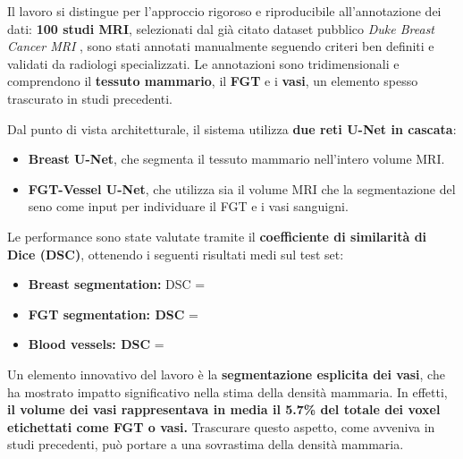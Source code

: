 Il lavoro si distingue per l’approccio rigoroso e riproducibile all’annotazione dei dati: \textbf{100 studi MRI}, selezionati dal già citato dataset pubblico \textit{Duke Breast Cancer MRI} \cite{duke_breast_mri}, sono stati annotati manualmente seguendo criteri ben definiti e validati da radiologi specializzati. Le annotazioni sono tridimensionali e comprendono il \textbf{tessuto mammario}, il \textbf{FGT} e i \textbf{vasi}, un elemento spesso trascurato in studi precedenti.

Dal punto di vista architetturale, il sistema utilizza \textbf{due reti U-Net in cascata}:
\begin{itemize}
\item \textbf{Breast U-Net}, che segmenta il tessuto mammario nell’intero volume MRI.
\item \textbf{FGT-Vessel U-Net}, che utilizza sia il volume MRI che la segmentazione del seno come input per individuare il FGT e i vasi sanguigni.
\end{itemize}

Le performance sono state valutate tramite il \textbf{coefficiente di similarità di Dice (DSC)}, ottenendo i seguenti risultati medi sul test set:
\begin{itemize}
\item \textbf{Breast segmentation:} DSC = 
\item \textbf{FGT segmentation: DSC} = 
\item \textbf{Blood vessels: DSC} = 
\end{itemize}

Un elemento innovativo del lavoro è la \textbf{segmentazione esplicita dei vasi}, che ha mostrato impatto significativo nella stima della densità mammaria. In effetti, \textbf{il volume dei vasi rappresentava in media il 5.7\% del totale dei voxel etichettati come FGT o vasi.} Trascurare questo aspetto, come avveniva in studi precedenti, può portare a una sovrastima della densità mammaria.


